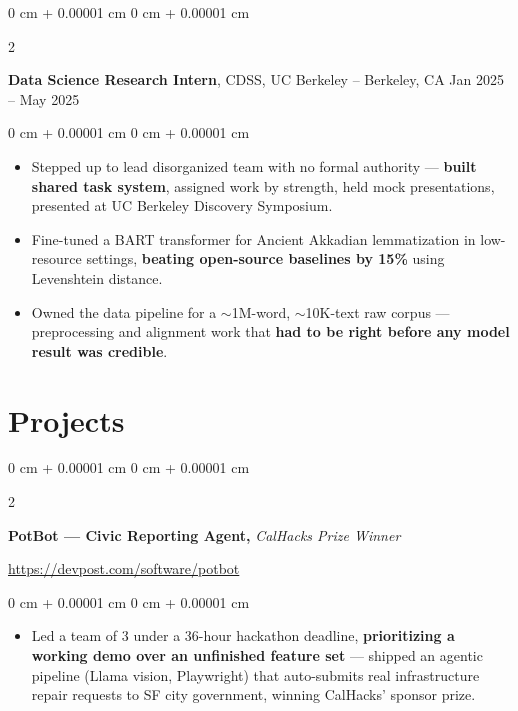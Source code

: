 \documentclass[10pt, letterpaper]{article}
\newenvironment{highlights}{
    \begin{itemize}[
        topsep=0.3 cm,
        parsep=0.075 cm,
        partopsep=0pt,
        itemsep=0.035 cm,
        leftmargin=0 cm + 10pt
    ]
}{
    \end{itemize}
} %
\newenvironment{onecolentry}{
    \begin{adjustwidth}{
        0 cm + 0.00001 cm
    }{
        0 cm + 0.00001 cm
    }
}{
    \end{adjustwidth}
} %
\newenvironment{twocolentry}[2][]{
    \onecolentry
    \def\secondColumn{#2}
    \setcolumnwidth{\fill, 4.5 cm}
    \begin{paracol}{2}
}{
    \switchcolumn \raggedleft \secondColumn
    \end{paracol}
    \endonecolentry
} %
\newenvironment{extendedtwocolentry}[2][]{
    \onecolentry
    \def\secondColumn{#2}
    \setcolumnwidth{\fill, 8 cm}
    \begin{paracol}{2}
}{
    \switchcolumn \raggedleft \secondColumn
    \end{paracol}
    \endonecolentry
}
\begin{document}
        \begin{twocolentry}{
            Jan 2025 – May 2025
        }
            \textbf{Data Science Research Intern}, CDSS, UC Berkeley -- Berkeley, CA\end{twocolentry}

        \vspace{0.19 cm}
        \begin{onecolentry}
            \begin{highlights}
                \item Stepped up to lead disorganized team with no formal authority — \textbf{built shared task system}, assigned work by strength, held mock presentations, presented at UC Berkeley Discovery Symposium.
                \item Fine-tuned a BART transformer for Ancient Akkadian lemmatization in low-resource settings, \textbf{beating open-source baselines by 15\%} using Levenshtein distance.
                \item Owned the data pipeline for a $\sim$1M-word, $\sim$10K-text raw corpus — preprocessing and alignment work that \textbf{had to be right before any model result was credible}.
            \end{highlights}
        \end{onecolentry}

    \section{Projects}

        \begin{extendedtwocolentry}{
            \href{https://devpost.com/software/potbot}{https://devpost.com/software/potbot}
        }
            \textbf{PotBot — Civic Reporting Agent,} \textit{CalHacks Prize Winner}
        \end{extendedtwocolentry}

        \vspace{0.19 cm}
        \begin{onecolentry}
            \begin{highlights}
                \item Led a team of 3 under a 36-hour hackathon deadline, \textbf{prioritizing a working demo over an unfinished feature set} — shipped an agentic pipeline (Llama vision, Playwright) that auto-submits real infrastructure repair requests to SF city government, winning CalHacks' sponsor prize.
            \end{highlights}
        \end{onecolentry}
\end{document}

